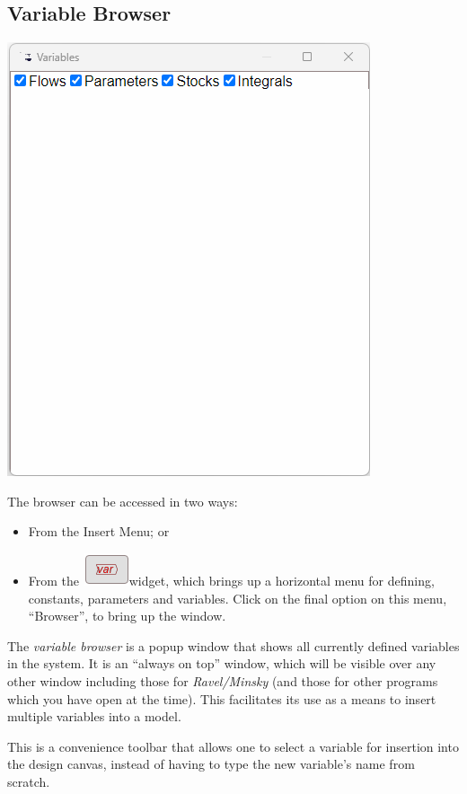 \subsection{Variable Browser}

\label{VariableBrowser}

\includegraphics{images/browserWindow}

The browser can be accessed in two ways:
\begin{itemize}
\item From the Insert Menu; or 
\item From the \includegraphics{images/var}widget, which brings up a horizontal
menu for defining, constants, parameters and variables. Click on the
final option on this menu, ``Browser'', to bring up the window. 
\end{itemize}
The \emph{variable browser} is a popup window that shows all currently
defined variables in the system. It is an ``always on top'' window,
which will be visible over any other window including those for \emph{Ravel/Minsky}
(and those for other programs which you have open at the time). This
facilitates its use as a means to insert multiple variables into a
model.

This is a convenience toolbar that allows one to select a variable
for insertion into the design canvas, instead of having to type the
new variable's name from scratch.

